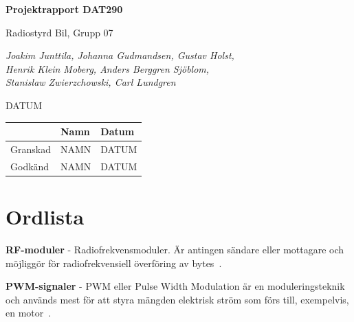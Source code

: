 \documentclass[a4paper]{article}
\begin{document}
\begin{titlepage}
\centering
{\bfseries\huge Projektrapport DAT290}

\vspace{10mm}

{\Large Radiostyrd Bil, Grupp 07}

\vspace{20mm}

{\Large \itshape{Joakim Junttila, Johanna Gudmandsen, Gustav Holst,\\Henrik Klein Moberg, Anders Berggren Sjöblom, \\[1mm] Stanislaw Zwierzchowski, Carl Lundgren}}

\vspace{10mm}

{DATUM}


\normalsize{
\begin{table}[b]
\centering
\begin{tabular}{|l|l|l|}  \hline
         & \bf Namn & \bf Datum   \\ \hline \hline
Granskad & NAMN     & DATUM        \\ \hline
Godkänd  & NAMN     & DATUM         \\ \hline
\end{tabular} 
\end{table}}
\end{titlepage}

\tableofcontents

\newpage
\section{Ordlista}

\vspace{5mm} \noindent
{\bf RF-moduler} - Radiofrekvensmoduler. Är antingen sändare eller mottagare och möjliggör för radiofrekvensiell överföring av bytes~\cite{RFModule}.

\vspace{5mm} \noindent
{\bf PWM-signaler} - PWM eller Pulse Width Modulation är en moduleringsteknik och används mest för att styra mängden elektrisk ström som förs till, exempelvis, en motor~\cite{PWM}.
\end{document}
